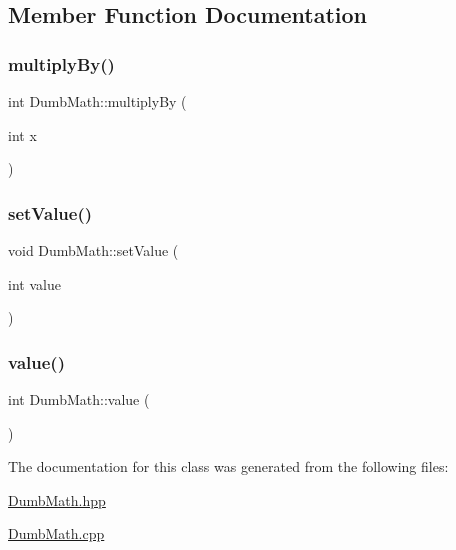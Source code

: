 \subsection{Member Function Documentation}
\mbox{\label{classbasicLib_1_1DumbMath_a259a29619fe7b9f3609608e2d764e51b}} 
\subsubsection{\texorpdfstring{multiply\+By()}{multiplyBy()}}
{\footnotesize\ttfamily int Dumb\+Math\+::multiply\+By (\begin{DoxyParamCaption}\item[{int}]{x }\end{DoxyParamCaption})}

\mbox{\label{classbasicLib_1_1DumbMath_aae5e0d45c7487f89bd49e6d84e0a9356}} 
\subsubsection{\texorpdfstring{set\+Value()}{setValue()}}
{\footnotesize\ttfamily void Dumb\+Math\+::set\+Value (\begin{DoxyParamCaption}\item[{int}]{value }\end{DoxyParamCaption})}

\mbox{\label{classbasicLib_1_1DumbMath_aa2e0180126b6f246d28da2d224f151b1}} 
\subsubsection{\texorpdfstring{value()}{value()}}
{\footnotesize\ttfamily int Dumb\+Math\+::value (\begin{DoxyParamCaption}{ }\end{DoxyParamCaption})}



The documentation for this class was generated from the following files\+:\begin{DoxyCompactItemize}
\item 
\hyperlink{DumbMath_8hpp}{Dumb\+Math.\+hpp}\item 
\hyperlink{DumbMath_8cpp}{Dumb\+Math.\+cpp}\end{DoxyCompactItemize}
